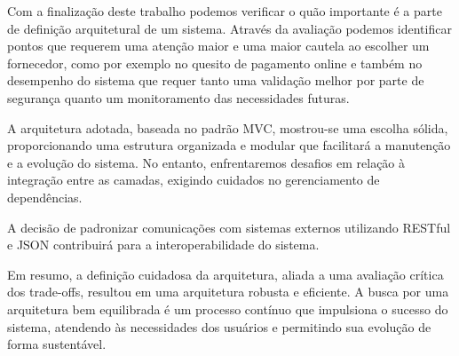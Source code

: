  Com a finalização deste trabalho podemos verificar o quão importante é a parte de definição arquitetural de um sistema. Através da avaliação 
 podemos identificar pontos que requerem uma atenção maior e uma maior cautela ao escolher um fornecedor, como por exemplo no quesito de pagamento online 
 e também no desempenho do sistema que requer tanto uma validação melhor por parte de segurança quanto um monitoramento das necessidades futuras.

 A arquitetura adotada, baseada no padrão MVC, mostrou-se uma escolha sólida, proporcionando uma 
 estrutura organizada e modular que facilitará a manutenção e a evolução do sistema. No entanto, enfrentaremos
 desafios em relação à integração entre as camadas, exigindo cuidados no gerenciamento de dependências.

 A decisão de padronizar comunicações com sistemas externos utilizando RESTful e JSON contribuirá
 para a interoperabilidade do sistema.

 Em resumo, a definição cuidadosa da arquitetura, aliada a uma avaliação crítica dos trade-offs, resultou em uma 
 arquitetura robusta e eficiente. A busca por uma arquitetura bem equilibrada é um processo contínuo que 
 impulsiona o sucesso do sistema, atendendo às necessidades dos usuários e permitindo sua evolução de 
 forma sustentável.